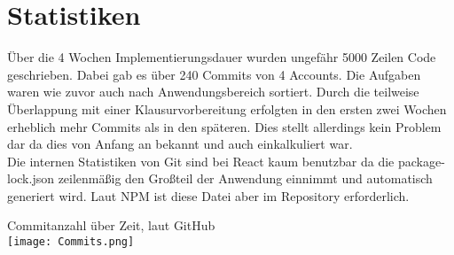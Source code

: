 \section{Statistiken}

Über die 4 Wochen Implementierungsdauer wurden ungefähr 5000 Zeilen Code geschrieben.
Dabei gab es über 240 Commits von 4 Accounts.
Die Aufgaben waren wie zuvor auch nach Anwendungsbereich sortiert. Durch die teilweise Überlappung
mit einer Klausurvorbereitung erfolgten in den ersten zwei Wochen erheblich mehr Commits als in 
den späteren. Dies stellt allerdings kein Problem dar da dies von Anfang an bekannt
und auch einkalkuliert war.\\

Die internen Statistiken von Git sind bei React kaum benutzbar da die package-lock.json
zeilenmäßig den Großteil der Anwendung einnimmt und automatisch generiert wird.
Laut NPM ist diese Datei aber im Repository erforderlich.

Commitanzahl über Zeit, laut GitHub\\
\texttt{[image: Commits.png]}